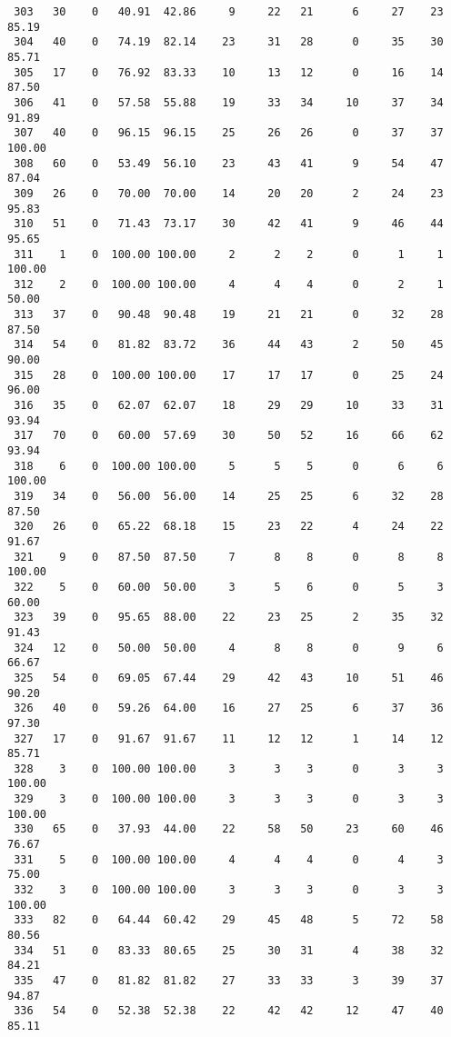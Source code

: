 \begin{verbatim}
 303   30    0   40.91  42.86     9     22   21      6     27    23    85.19
 304   40    0   74.19  82.14    23     31   28      0     35    30    85.71
 305   17    0   76.92  83.33    10     13   12      0     16    14    87.50
 306   41    0   57.58  55.88    19     33   34     10     37    34    91.89
 307   40    0   96.15  96.15    25     26   26      0     37    37   100.00
 308   60    0   53.49  56.10    23     43   41      9     54    47    87.04
 309   26    0   70.00  70.00    14     20   20      2     24    23    95.83
 310   51    0   71.43  73.17    30     42   41      9     46    44    95.65
 311    1    0  100.00 100.00     2      2    2      0      1     1   100.00
 312    2    0  100.00 100.00     4      4    4      0      2     1    50.00
 313   37    0   90.48  90.48    19     21   21      0     32    28    87.50
 314   54    0   81.82  83.72    36     44   43      2     50    45    90.00
 315   28    0  100.00 100.00    17     17   17      0     25    24    96.00
 316   35    0   62.07  62.07    18     29   29     10     33    31    93.94
 317   70    0   60.00  57.69    30     50   52     16     66    62    93.94
 318    6    0  100.00 100.00     5      5    5      0      6     6   100.00
 319   34    0   56.00  56.00    14     25   25      6     32    28    87.50
 320   26    0   65.22  68.18    15     23   22      4     24    22    91.67
 321    9    0   87.50  87.50     7      8    8      0      8     8   100.00
 322    5    0   60.00  50.00     3      5    6      0      5     3    60.00
 323   39    0   95.65  88.00    22     23   25      2     35    32    91.43
 324   12    0   50.00  50.00     4      8    8      0      9     6    66.67
 325   54    0   69.05  67.44    29     42   43     10     51    46    90.20
 326   40    0   59.26  64.00    16     27   25      6     37    36    97.30
 327   17    0   91.67  91.67    11     12   12      1     14    12    85.71
 328    3    0  100.00 100.00     3      3    3      0      3     3   100.00
 329    3    0  100.00 100.00     3      3    3      0      3     3   100.00
 330   65    0   37.93  44.00    22     58   50     23     60    46    76.67
 331    5    0  100.00 100.00     4      4    4      0      4     3    75.00
 332    3    0  100.00 100.00     3      3    3      0      3     3   100.00
 333   82    0   64.44  60.42    29     45   48      5     72    58    80.56
 334   51    0   83.33  80.65    25     30   31      4     38    32    84.21
 335   47    0   81.82  81.82    27     33   33      3     39    37    94.87
 336   54    0   52.38  52.38    22     42   42     12     47    40    85.11

\end{verbatim}
